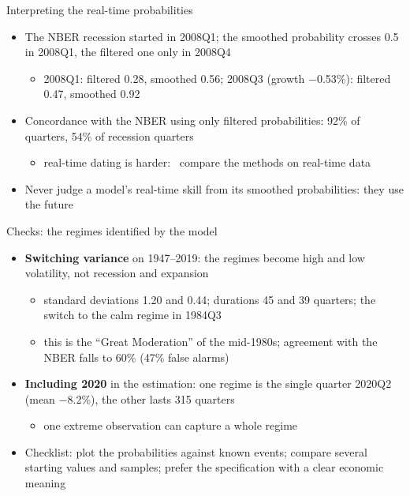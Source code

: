 \begin{frame}{Interpreting the real-time probabilities}
\itemsize{\small}
\begin{itemize}
    \item The NBER recession started in 2008Q1; the smoothed probability crosses 0.5 in 2008Q1, the filtered one only in 2008Q4
    \begin{itemize}
        \item 2008Q1: filtered 0.28, smoothed 0.56; 2008Q3 (growth \ensuremath{-}0.53\%): filtered 0.47, smoothed 0.92
    \end{itemize}
    \item Concordance with the NBER using only filtered probabilities: 92\% of quarters, 54\% of recession quarters
    \begin{itemize}
        \item real-time dating is harder: \ compare the methods on real-time data
    \end{itemize}
    \item Never judge a model's real-time skill from its smoothed probabilities: they use the future
\end{itemize}
\end{frame}

\begin{frame}{Checks: the regimes identified by the model}
\itemsize{\small}
\begin{itemize}
    \item \textbf{Switching variance} on 1947--2019: the regimes become high and low volatility, not recession and expansion
    \begin{itemize}
        \item standard deviations 1.20 and 0.44; durations 45 and 39 quarters; the switch to the calm regime in 1984Q3
        \item this is the ``Great Moderation'' of the mid-1980s; agreement with the NBER falls to 60\% (47\% false alarms)
    \end{itemize}
    \item \textbf{Including 2020} in the estimation: one regime is the single quarter 2020Q2 (mean \ensuremath{-}8.2\%), the other lasts 315 quarters
    \begin{itemize}
        \item one extreme observation can capture a whole regime
    \end{itemize}
    \item Checklist: plot the probabilities against known events; compare several starting values and samples; prefer the specification with a clear economic meaning
\end{itemize}
\end{frame}

